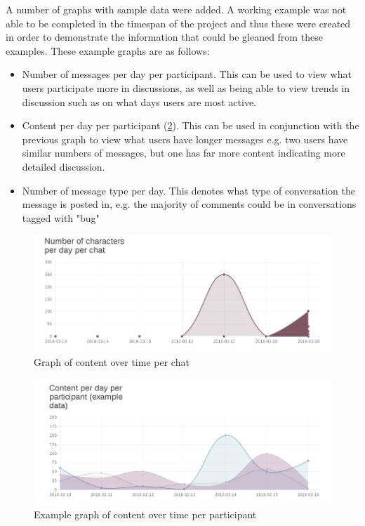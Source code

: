 \documentclass{l4proj}
\begin{document}
\newpage


A number of graphs with sample data were added.  A working example was not able to be completed in the timespan of the project and thus these were created in order to demonstrate the information that could be gleaned from these examples.  These example graphs are as follows:

\begin{itemize}
\item Number of messages per day per participant.  This can be used to view what users participate more in discussions, as well as being able to view trends in discussion such as on what days users are most active.
\item Content per day per participant (\ref{fig:4}).  This can be used in conjunction with the previous graph to view what users have longer messages e.g. two users have similar numbers of messages, but one has far more content indicating more detailed discussion.
\item Number of message type per day.  This denotes what type of conversation the message is posted in, e.g. the majority of comments could be in conversations tagged with "bug"
\end{itemize}

\begin{figure}[h]
\includegraphics[scale=0.75]{WorkingGraph.png}
\centering
\caption{Graph of content over time per chat}
\label{fig:3}
\end{figure}


\begin{figure}[h]
\includegraphics[scale=0.75]{SampleGraph.png}
\centering
\caption{Example graph of content over time per participant}
\label{fig:4}

\end{figure}
\end{document}
